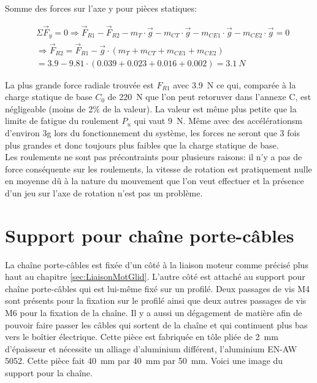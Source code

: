Somme des forces sur l'axe y pour pièces statiques:

\begin{equation}
  \begin{aligned}
     & \Sigma \vec{F}_y = 0 \Rightarrow \vec{F}_{R1} - \vec{F}_{R2} - m_T \cdot \vec{g} - m_{CT} \cdot \vec{g} - m_{CE1} \cdot \vec{g} - m_{CE2} \cdot \vec{g} = 0 \\
     & \Rightarrow \vec{F}_{R2} = \vec{F}_{R1} - \vec{g} \cdot (m_T + m_{CT} + m_{CE1} + m_{CE2})                                                                  \\
     & = 3.9 - 9.81 \cdot (0.039 + 0.023 + 0.016 +0.002) = 3.1~N
  \end{aligned}
\end{equation}

La plus grande force radiale trouvée est $F_{R1}$ avec 3.9~N ce qui, comparée à la charge statique de base $C_0$ de 220~N que l'on peut retoruver dans
l'annexe C, est négligeable (moins de 2\% de la valeur). La valeur est même plus petite que la limite de fatigue du roulement $P_u$ qui vaut 9~N.
Même avec des accélérationsm d'environ 3g lors du fonctionnement du système, les forces ne seront que 3 fois plus grandes et donc toujours
plus faibles que la charge statique de base.\\

Les roulements ne sont pas précontraints pour plusieurs raisons: il n'y a pas de force conséquente sur les roulements, la vitesse de rotation
est pratiquement nulle en moyenne dû à la nature du mouvement que l'on veut effectuer et la présence d'un jeu sur l'axe de rotation n'est pas
un problème.

\section{Support pour chaîne porte-câbles}\label{sec:SupChainCable}
La chaîne porte-câbles est fixée d'un côté à la liaison moteur comme précisé plus haut au chapitre \ref{sec:LiaisonMotGlid}. L'autre côté est
attaché au support pour chaîne porte-câbles qui est lui-même fixé sur un profilé. Deux passages de vis M4 sont présents pour la fixation sur
le profilé ainsi que deux autres passages de vis M6 pour la fixation de la chaîne. Il y a aussi un dégagement de matière afin de pouvoir faire
passer les câbles qui sortent de la chaîne et qui continuent plus bas vers le boîtier électrique. Cette pièce est fabriquée en tôle pliée de
2~mm d'épaisseur et nécessite un alliage d'aluminium différent, l'aluminium EN-AW 5052. Cette pièce fait 40~mm par 40~mm par 50~mm.
Voici une image du support pour la chaîne.

